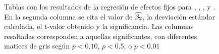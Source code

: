 \begin{figure}[pt!]
\caption{Tablas con los resultados de la regresión de efectos fijos para \NOISETOHARMONICS, \SYLAVG, \PHONAVG, \LOCALSHIMMER y \LOCALJITTER. En la segunda columna se cita el valor de $\widehat{\beta_2}$, la desviación estándar calculada, el t-valor obtenido y la significancia. Las columnas resaltadas corresponden a aquellas significantes, con diferentes matices de gris según $p < 0.10$, $p < 0.5$, o $p < 0.01$}

\label{fig:efectos_fijos_tabla2}
\end{figure}
